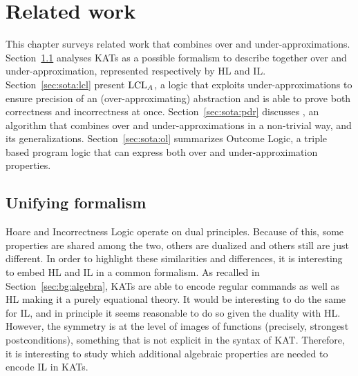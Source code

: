 
\chapter{Related work}\label{ch:sota}
This chapter surveys related work that combines over and under-approximations.
Section~\ref{sec:sota:kat} analyses KATs as a possible formalism to describe together over and under-approximation, represented respectively by HL and IL.
Section~\ref{sec:sota:lcl} present $\text{LCL}_A$, a logic that exploits under-approximations to ensure precision of an (over-approximating) abstraction and is able to prove both correctness and incorrectness at once.
Section~\ref{sec:sota:pdr} discusses , an algorithm that combines over and under-approximations in a non-trivial way, and its generalizations.
Section~\ref{sec:sota:ol} summarizes Outcome Logic, a triple based program logic that can express both over and under-approximation properties.

\section{Unifying formalism}\label{sec:sota:kat}
Hoare and Incorrectness Logic operate on dual principles. Because of this, some properties are shared among the two, others are dualized and others still are just different. In order to highlight these similarities and differences, it is interesting to embed HL and IL in a common formalism. As recalled in Section~\ref{sec:bg:algebra}, KATs are able to encode regular commands \cite{Kozen97} as well as HL \cite{Kozen00} making it a purely equational theory.
It would be interesting to do the same for IL, and in principle it seems reasonable to do so given the duality with HL. However, the symmetry is at the level of images of functions (precisely, strongest postconditions), something that is not explicit in the syntax of KAT. Therefore, it is interesting to study which additional algebraic properties are needed to encode IL in KATs.

